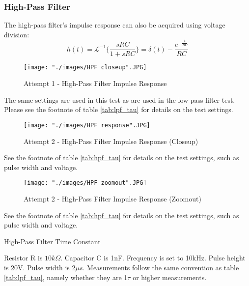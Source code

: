 \documentclass{article}
\begin{document}
	\subsubsection{High-Pass Filter}
	The high-pass filter's impulse response can also be acquired using voltage division:
	\begin{equation}
	\label{eq:ir_hpf}
	h(t) = \mathcal{L}^{-1}\{ \frac{ sRC }{ 1 + sRC } \} = \delta(t) - \frac{ e^{- \frac{t}{RC} } }{RC}
	\end{equation}
	
	\FloatBarrier
	
	\begin{figure}[h!]
		\centering
		\texttt{[image: "./images/HPF closeup".JPG]}
		\caption{Attempt 1 - High-Pass Filter Impulse Response}
		\label{fig:lpf_response}
	\end{figure}
	
	\FloatBarrier
	
	{\footnotesize The same settings are used in this test as are used in the low-pass filter test. Please see the footnote of table \ref{tab:lpf_tau} for details on the test settings.}
	
	\FloatBarrier
	
	\begin{figure}[h!]
		\centering
		\texttt{[image: "./images/HPF response".JPG]}
		\caption{Attempt 2 - High-Pass Filter Impulse Response (Closeup)}
		\label{fig:hpf_response_closeup}
	\end{figure}
	
	\FloatBarrier
	
	{\footnotesize See the footnote of table \ref{tab:hpf_tau} for details on the test settings, such as pulse width and voltage.}
	
	\FloatBarrier
	
	\begin{figure}[h!]
		\centering
		\texttt{[image: "./images/HPF zoomout".JPG]}
		\caption{Attempt 2 - High-Pass Filter Impulse Response (Zoomout)}
		\label{fig:hpf_response_zoomout}
	\end{figure}
	
	\FloatBarrier
	
	{\footnotesize See the footnote of table \ref{tab:hpf_tau} for details on the test settings, such as pulse width and voltage.}
	
	\FloatBarrier
	
	\begin{table}[h!]
		\centering
		\caption{High-Pass Filter Time Constant}
		\label{tab:hpf_tau}
	\end{table}
	{\footnotesize Resistor R is $10k\Omega$. Capacitor C is 1nF. Frequency is set to 10kHz. Pulse height is 20V. Pulse width is $2\mu s$. Measurements follow the same convention as table \ref{tab:lpf_tau}, namely whether they are 1$\tau$ or higher measurements.} \\
	\FloatBarrier
	
\end{document}
